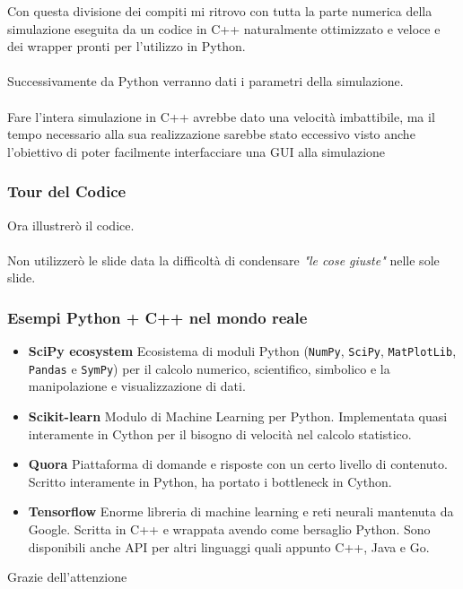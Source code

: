 \documentclass[11pt]{beamer}
\begin{document}
\begin{frame}
Con questa divisione dei compiti mi ritrovo con tutta la parte numerica della simulazione eseguita da un codice in C++ naturalmente ottimizzato e veloce e dei wrapper pronti per l'utilizzo in Python.\\\\
Successivamente da Python verranno dati i parametri della simulazione.\\\\
Fare l'intera simulazione in C++ avrebbe dato una velocità imbattibile, ma il tempo necessario alla sua realizzazione sarebbe stato eccessivo visto anche l'obiettivo di poter facilmente interfacciare una GUI alla simulazione
\end{frame}

\begin{frame}
\frametitle{Tour del Codice}
Ora illustrerò il codice.\\\\
Non utilizzerò le slide data la difficoltà di condensare \textit{"le cose giuste"} nelle sole slide.
\end{frame}

\begin{frame}
\frametitle{Esempi Python + C++ nel mondo reale}
\begin{itemize}
	\pause
	\item \textbf{SciPy ecosystem}
	Ecosistema di moduli Python (\texttt{NumPy}, \texttt{SciPy}, \texttt{MatPlotLib}, \texttt{Pandas} e \texttt{SymPy}) per il calcolo numerico, scientifico, simbolico e la manipolazione e visualizzazione di dati.
	\pause
	\item \textbf{Scikit-learn}
	Modulo di Machine Learning per Python. Implementata quasi interamente in Cython per il bisogno di velocità nel calcolo statistico.
	\pause
	\item \textbf{Quora}
	Piattaforma di domande e risposte con un certo livello di contenuto. Scritto interamente in Python, ha portato i bottleneck in Cython.
	\pause
	\item \textbf{Tensorflow}
	Enorme libreria di machine learning e reti neurali mantenuta da Google. Scritta in C++ e wrappata avendo come bersaglio Python. Sono disponibili anche API per altri linguaggi quali appunto C++, Java e Go.
\end{itemize}
\end{frame}

\begin{frame}
\centering
\Huge Grazie dell'attenzione
\end{frame}
\end{document}
